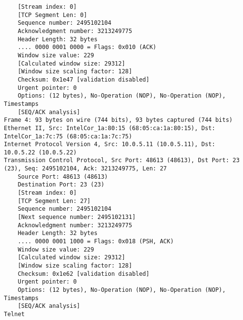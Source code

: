 \begin{lstlisting}
    [Stream index: 0]
    [TCP Segment Len: 0]
    Sequence number: 2495102104
    Acknowledgment number: 3213249775
    Header Length: 32 bytes
    .... 0000 0001 0000 = Flags: 0x010 (ACK)
    Window size value: 229
    [Calculated window size: 29312]
    [Window size scaling factor: 128]
    Checksum: 0x1e47 [validation disabled]
    Urgent pointer: 0
    Options: (12 bytes), No-Operation (NOP), No-Operation (NOP), Timestamps
    [SEQ/ACK analysis]
Frame 4: 93 bytes on wire (744 bits), 93 bytes captured (744 bits)
Ethernet II, Src: IntelCor_1a:80:15 (68:05:ca:1a:80:15), Dst: IntelCor_1a:7c:75 (68:05:ca:1a:7c:75)
Internet Protocol Version 4, Src: 10.0.5.11 (10.0.5.11), Dst: 10.0.5.22 (10.0.5.22)
Transmission Control Protocol, Src Port: 48613 (48613), Dst Port: 23 (23), Seq: 2495102104, Ack: 3213249775, Len: 27
    Source Port: 48613 (48613)
    Destination Port: 23 (23)
    [Stream index: 0]
    [TCP Segment Len: 27]
    Sequence number: 2495102104
    [Next sequence number: 2495102131]
    Acknowledgment number: 3213249775
    Header Length: 32 bytes
    .... 0000 0001 1000 = Flags: 0x018 (PSH, ACK)
    Window size value: 229
    [Calculated window size: 29312]
    [Window size scaling factor: 128]
    Checksum: 0x1e62 [validation disabled]
    Urgent pointer: 0
    Options: (12 bytes), No-Operation (NOP), No-Operation (NOP), Timestamps
    [SEQ/ACK analysis]
Telnet
\end{lstlisting}

